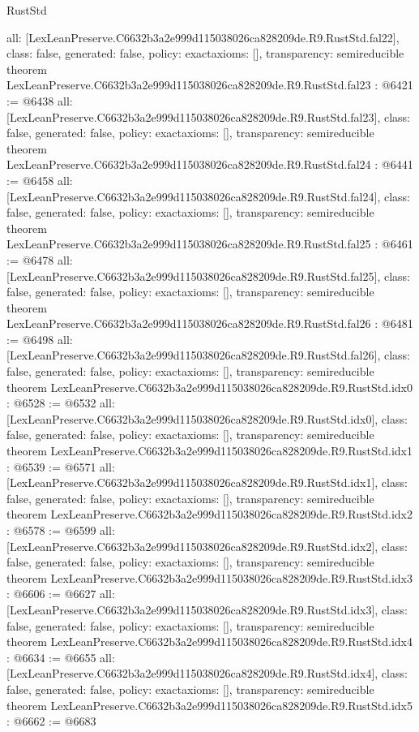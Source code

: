 \begin{lexlean}{RustStd}
\begin{coremodule}
{  all: [LexLeanPreserve.C6632b3a2e999d115038026ca828209de.R9.RustStd.fal22],
  class: false,
  generated: false,
  policy: exact{axioms: []},
  transparency: semireducible
}
theorem LexLeanPreserve.C6632b3a2e999d115038026ca828209de.R9.RustStd.fal23 : @6421 := @6438 {
  all: [LexLeanPreserve.C6632b3a2e999d115038026ca828209de.R9.RustStd.fal23],
  class: false,
  generated: false,
  policy: exact{axioms: []},
  transparency: semireducible
}
theorem LexLeanPreserve.C6632b3a2e999d115038026ca828209de.R9.RustStd.fal24 : @6441 := @6458 {
  all: [LexLeanPreserve.C6632b3a2e999d115038026ca828209de.R9.RustStd.fal24],
  class: false,
  generated: false,
  policy: exact{axioms: []},
  transparency: semireducible
}
theorem LexLeanPreserve.C6632b3a2e999d115038026ca828209de.R9.RustStd.fal25 : @6461 := @6478 {
  all: [LexLeanPreserve.C6632b3a2e999d115038026ca828209de.R9.RustStd.fal25],
  class: false,
  generated: false,
  policy: exact{axioms: []},
  transparency: semireducible
}
theorem LexLeanPreserve.C6632b3a2e999d115038026ca828209de.R9.RustStd.fal26 : @6481 := @6498 {
  all: [LexLeanPreserve.C6632b3a2e999d115038026ca828209de.R9.RustStd.fal26],
  class: false,
  generated: false,
  policy: exact{axioms: []},
  transparency: semireducible
}
theorem LexLeanPreserve.C6632b3a2e999d115038026ca828209de.R9.RustStd.idx0 : @6528 := @6532 {
  all: [LexLeanPreserve.C6632b3a2e999d115038026ca828209de.R9.RustStd.idx0],
  class: false,
  generated: false,
  policy: exact{axioms: []},
  transparency: semireducible
}
theorem LexLeanPreserve.C6632b3a2e999d115038026ca828209de.R9.RustStd.idx1 : @6539 := @6571 {
  all: [LexLeanPreserve.C6632b3a2e999d115038026ca828209de.R9.RustStd.idx1],
  class: false,
  generated: false,
  policy: exact{axioms: []},
  transparency: semireducible
}
theorem LexLeanPreserve.C6632b3a2e999d115038026ca828209de.R9.RustStd.idx2 : @6578 := @6599 {
  all: [LexLeanPreserve.C6632b3a2e999d115038026ca828209de.R9.RustStd.idx2],
  class: false,
  generated: false,
  policy: exact{axioms: []},
  transparency: semireducible
}
theorem LexLeanPreserve.C6632b3a2e999d115038026ca828209de.R9.RustStd.idx3 : @6606 := @6627 {
  all: [LexLeanPreserve.C6632b3a2e999d115038026ca828209de.R9.RustStd.idx3],
  class: false,
  generated: false,
  policy: exact{axioms: []},
  transparency: semireducible
}
theorem LexLeanPreserve.C6632b3a2e999d115038026ca828209de.R9.RustStd.idx4 : @6634 := @6655 {
  all: [LexLeanPreserve.C6632b3a2e999d115038026ca828209de.R9.RustStd.idx4],
  class: false,
  generated: false,
  policy: exact{axioms: []},
  transparency: semireducible
}
theorem LexLeanPreserve.C6632b3a2e999d115038026ca828209de.R9.RustStd.idx5 : @6662 := @6683 {
}
\end{coremodule}
\end{lexlean}
